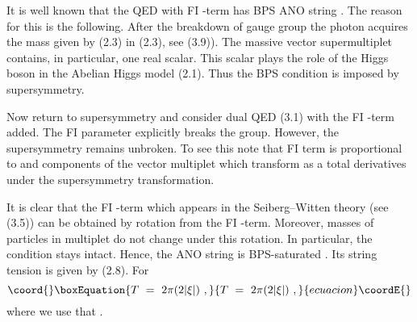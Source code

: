\documentclass[a4paper,12pt]{article}
\begin{document}
It is well known that the \coordHE{} QED  with FI \coordHE{}-term has BPS
ANO string \cite{HS,DDT,GS}. The reason for this is the following.
After the breakdown of \coordHE{} gauge group the photon acquires
the mass given by
(2.3) \coordHE{} in (2.3), see (3.9)). The massive
vector \coordHE{} supermultiplet contains, in particular, one real
scalar. This scalar plays the role of the Higgs boson in the
Abelian Higgs model (2.1). Thus the BPS condition \coordHE{}
is imposed by supersymmetry.

Now return to \coordHE{} supersymmetry and consider dual
QED (3.1) with the FI \coordHE{}-term added.
 The FI parameter \coordHE{}
explicitly breaks the \coordHE{} group. However, the \coordHE{}
supersymmetry remains unbroken. To see this note that FI term
is proportional to   \coordHE{} and \coordHE{} components of the vector multiplet
which transform as a total derivatives under the \coordHE{}
supersymmetry transformation.


It is clear that  the FI \coordHE{}-term which appears in the
Seiberg--Witten theory (see (3.5)) can be obtained by \coordHE{}
rotation from the FI \coordHE{}-term. Moreover, masses of particles in
\coordHE{} multiplet do not change under this rotation.
In particular, the condition
\coordHE{} stays intact. Hence, the ANO
string is BPS-saturated   \cite{HSZ,Sp,VY}.
Its string tension is given by (2.8). For \coordHE{}
\begin{equation}\coord{}\boxEquation{
T\ =\ 2\pi(2|\xi|)\ ,
}{
T\ =\ 2\pi(2|\xi|)\ ,
}{ecuacion}\coordE{}\end{equation}
where we use that \coordHE{}.
\end{document}
